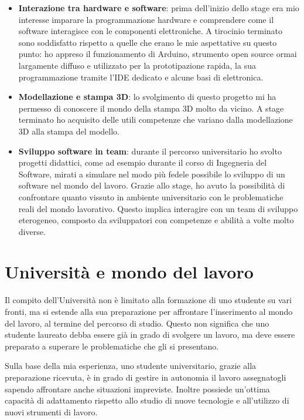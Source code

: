 \begin{itemize}
\item \textbf{Interazione tra hardware e software}: prima dell'inizio dello stage era mio interesse imparare la programmazione hardware e comprendere come il software interagisce con le componenti elettroniche. A tirocinio terminato sono soddisfatto rispetto a quelle che erano le mie aspettative su questo punto: ho appreso il funzionamento di Arduino, strumento open source ormai largamente diffuso e utilizzato per la prototipazione rapida, la sua programmazione tramite l'IDE dedicato e alcune basi di elettronica.
\item \textbf{Modellazione e stampa 3D}: lo svolgimento di questo progetto mi ha permesso di conoscere il mondo della stampa 3D molto da vicino. A stage terminato ho acquisito delle utili competenze che variano dalla modellazione 3D alla stampa del modello.
\item \textbf{Sviluppo software in team}: durante il percorso universitario ho svolto progetti didattici, come ad esempio durante il corso di Ingegneria del Software, mirati a simulare nel modo più fedele possibile lo sviluppo di un software nel mondo del lavoro. Grazie allo stage, ho avuto la possibilità di confrontare quanto vissuto in ambiente universitario con le problematiche reali del mondo lavorativo. Questo implica interagire con un team di sviluppo eterogeneo, composto da sviluppatori con competenze e abilità a volte molto diverse.
\end{itemize}

\section{Università e mondo del lavoro}
Il compito dell'Università non è limitato alla formazione di uno studente su vari fronti, ma si estende alla sua preparazione per affrontare l'inserimento al mondo del lavoro, al termine del percorso di studio. Questo non significa che uno studente laureato debba essere già in grado di svolgere un lavoro, ma deve essere preparato a superare le problematiche che gli si presentano. 

\medskip

Sulla base della mia esperienza, uno studente universitario, grazie alla preparazione ricevuta, è in grado di  gestire in autonomia il lavoro assegnatogli sapendo affrontare anche situazioni impreviste. Inoltre possiede un'ottima capacità di adattamento rispetto allo studio di nuove tecnologie e all'utilizzo di nuovi strumenti di lavoro.

